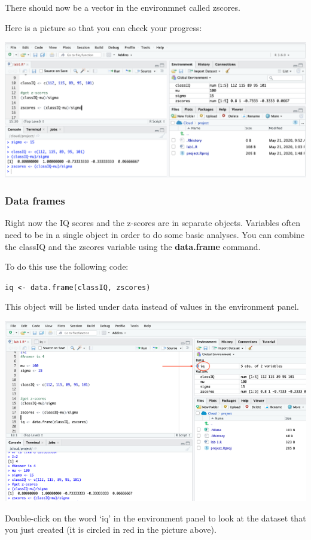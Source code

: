 \documentclass[
]{book}
\begin{document}
There should now be a vector in the environmnet called zscores.

Here is a picture so that you can check your progress:

\includegraphics{img/zsaved.png}

\hypertarget{data-frames}{%
\subsubsection{Data frames}\label{data-frames}}

Right now the IQ scores and the z-scores are in separate objects. Variables often need to be in a single object in order to do some basic analyses. You can combine the classIQ and the zscores variable using the \textbf{data.frame} command.

To do this use the following code:

\texttt{iq\ \textless{}-\ data.frame(classIQ,\ zscores)}

This object will be listed under data instead of values in the environment panel.

\includegraphics{img/dataframe.png}

Double-click on the word `iq' in the environment panel to look at the dataset that you just created (it is circled in red in the picture above).
\end{document}
